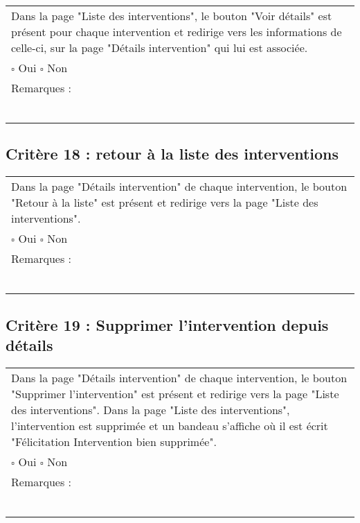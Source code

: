 	\begin{center}
    	 		\begin{tabular}[h]{|p{}|}
			\hline
				Dans la page "Liste des interventions", le bouton "Voir détails" est présent pour chaque intervention et redirige vers les informations de celle-ci, sur la page "Détails intervention" qui lui est associée.\\
				$\square$ Oui  \hfill \hfill $\square$ Non \\\hline Remarques : \\ ~\\
			 \\\hline
     		\end{tabular}
  		\end{center}	
  		
  		
  		\subsection*{Critère 18 : retour à la liste des interventions}
	
	\begin{center}
    	 		\begin{tabular}[h]{|p{}|}
			\hline
				Dans la page "Détails intervention" de chaque intervention, le bouton "Retour à la liste" est présent et redirige vers la page "Liste des interventions".\\
				$\square$ Oui  \hfill \hfill $\square$ Non \\\hline Remarques : \\ ~\\
			 \\\hline
     		\end{tabular}
  		\end{center}	
  		
  		
  		\subsection*{Critère 19 : Supprimer l'intervention depuis détails}
	
	\begin{center}
    	 		\begin{tabular}[h]{|p{}|}
			\hline
				Dans la page "Détails intervention" de chaque intervention, le bouton "Supprimer l'intervention" est présent et redirige vers la page "Liste des interventions". Dans la page "Liste des interventions", l'intervention est supprimée et un bandeau s'affiche où il est écrit "Félicitation Intervention bien supprimée".\\
				$\square$ Oui  \hfill \hfill $\square$ Non \\\hline Remarques : \\ ~\\
			 \\\hline
     		\end{tabular}
  		\end{center}
  		
